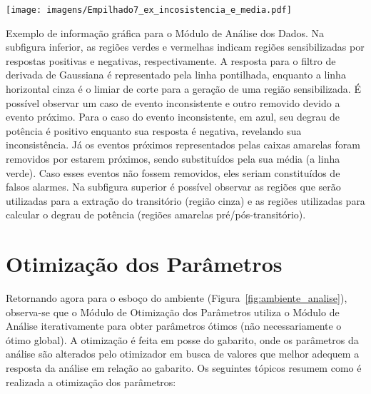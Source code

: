 \begin{SidewaysFigure}
\centering
\texttt{[image: imagens/Empilhado7\_ex\_incosistencia\_e\_media.pdf]}
\caption[Exemplo de informação gráfica para o Módulo de Análise dos
Dados.]{Exemplo de informação gráfica para o Módulo de Análise dos
Dados. Na subfigura inferior, as regiões verdes e vermelhas indicam
regiões sensibilizadas por respostas positivas e negativas,
respectivamente. A resposta para o filtro de
derivada de Gaussiana é representado pela linha pontilhada, enquanto a
linha horizontal cinza é o limiar de corte para a geração de uma região
sensibilizada. É possível observar um caso de evento inconsistente e
outro removido devido a evento próximo. Para o caso do evento inconsistente, em azul, seu
degrau de potência é positivo enquanto sua resposta é negativa,
revelando sua inconsistência. Já os eventos próximos representados
pelas caixas amarelas foram removidos por estarem próximos, sendo
substituídos pela sua média (a linha verde). Caso esses eventos não
fossem removidos, eles seriam constituídos de falsos alarmes. Na
subfigura superior é possível observar as regiões que serão utilizadas
para a extração do transitório (região cinza) e as regiões utilizadas
para calcular o degrau de potência (regiões amarelas
pré/pós-transitório). }
\label{fig:analise_eventos}
\end{SidewaysFigure}


\section{Otimização dos Parâmetros}
\label{sec:otimizacao}

Retornando agora para o esboço do ambiente
(Figura~\ref{fig:ambiente_analise}), observa-se que o Módulo de
Otimização dos Parâmetros utiliza o Módulo de Análise iterativamente
para obter parâmetros ótimos (não necessariamente o ótimo global).
A otimização é feita em posse do gabarito, onde os parâmetros da
análise são alterados pelo otimizador em busca de valores que melhor
adequem a resposta da análise em relação ao gabarito. Os seguintes
tópicos resumem como é realizada a otimização dos parâmetros:

